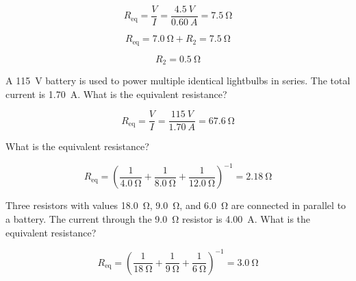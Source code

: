 \documentclass[answers]{exam}
\begin{document}
\begin{questions}
\begin{solution}
\begin{equation*}
    R_\mathrm{eq} = \frac{V}{I} = \frac{\SI{4.5}{V}}{\SI{0.60}{A}} = \SI{7.5}{\ohm}
\end{equation*}

\begin{equation*}
    R_\mathrm{eq} = \SI{7.0}{\ohm} + R_2 = \SI{7.5}{\ohm}
\end{equation*}

\begin{equation*}
    \boxed{R_2 = \SI{0.5}{\ohm}}
\end{equation*}
\end{solution}

\question 
A \SI{115}{V} battery is used to power multiple identical lightbulbs in series. The total current is \SI{1.70}{A}. What is the equivalent resistance?

\begin{solution}
\begin{equation*}
    R_\mathrm{eq} = \frac{V}{I} = \frac{\SI{115}{V}}{\SI{1.70}{A}} = \boxed{\SI{67.6}{\ohm}}
\end{equation*}
\end{solution}



\question 
What is the equivalent resistance?

\begin{center}
\end{center}



\begin{solution}
\begin{equation*}
    R_\mathrm{eq} = \left(\frac{1}{\SI{4.0}{\ohm}} + \frac{1}{\SI{8.0}{\ohm}} + \frac{1}{\SI{12.0}{\ohm}}\right)^{-1} = \boxed{\SI{2.18}{\ohm}}
\end{equation*}
\end{solution}



\question
Three resistors with values \SI{18.0}{\ohm}, \SI{9.0}{\ohm}, and \SI{6.0}{\ohm} are connected in parallel to a battery. The current through the \SI{9.0}{\ohm} resistor is \SI{4.00}{A}. What is the equivalent resistance?

\begin{solution}
\begin{equation*}
    R_\mathrm{eq} = \left(\frac{1}{\SI{18}{\ohm}} + \frac{1}{\SI{9}{\ohm}} + \frac{1}{\SI{6}{\ohm}}\right)^{-1} = \boxed{\SI{3.0}{\ohm}}
\end{equation*}
\end{solution}


\end{questions}
\end{document}
